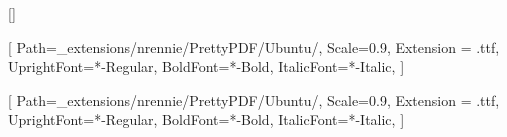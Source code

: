 \usepackage{geometry}
\usepackage{xcolor}
\usepackage{fancyhdr}
\usepackage{fontspec}
\usepackage[compact]{titlesec}
\usepackage{lipsum}
\usepackage{ragged2e}
\usepackage{enumitem}

\geometry{letterpaper, left=12.5mm, top=12.5mm, bottom=12.5mm, right=12.5mm}


\setlength{\footskip}{15pt}   %

\titleformat{\subsection}{\sffamily\small\bfseries}{\thesection}{0em}{}[{\titlerule[0.8pt]}]

\makeatletter
\renewcommand{\maketitle}{\bgroup\setlength{\parindent}{0pt}
\begin{flushleft} %
  {\sffamily\huge\textbf{\@title}} \vspace{4pt} \newline
  {\Large {\@subtitle}} \vspace{0pt} %
\end{flushleft}\egroup
}
\makeatother

\setsansfont{Ubuntu}[
    Path=_extensions/nrennie/PrettyPDF/Ubuntu/,
    Scale=0.9,
    Extension = .ttf,
    UprightFont=*-Regular,
    BoldFont=*-Bold,
    ItalicFont=*-Italic,
    ]

\setmainfont{Ubuntu}[
    Path=_extensions/nrennie/PrettyPDF/Ubuntu/,
    Scale=0.9,
    Extension = .ttf,
    UprightFont=*-Regular,
    BoldFont=*-Bold,
    ItalicFont=*-Italic,
    ]
